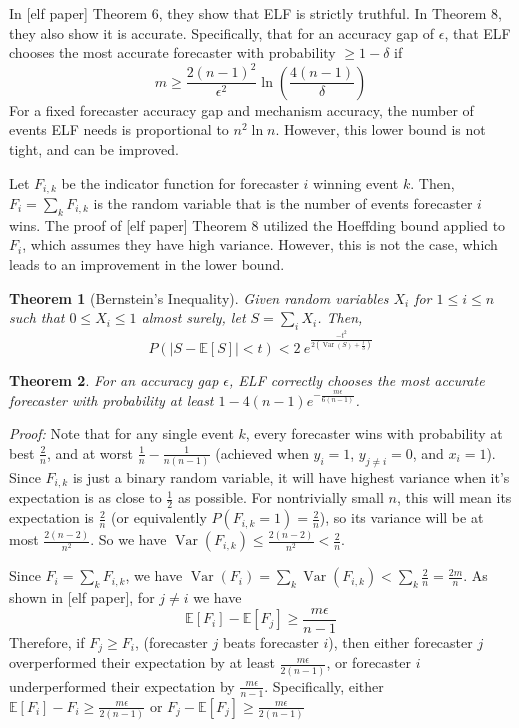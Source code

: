 \documentclass[letterpaper,12pt]{article}
\DeclareMathOperator*{\Var}{Var}
\newcommand{\E}{\mathbb{E}}
\newcommand{\1}{\mathbbm{1}}
\newtheorem{theorem}{Theorem}
\begin{document}
In [elf paper] Theorem 6, they show that ELF is strictly truthful. In Theorem 8, they also show it is accurate. Specifically, that for an accuracy gap of $\epsilon$, that ELF chooses the most accurate forecaster with probability $ \geq 1 - \delta$ if
\[ m \geq \frac{2(n-1)^2}{\epsilon^2} \ln \left(\frac{4(n-1)}{\delta}\right)\]
For a fixed forecaster accuracy gap and mechanism accuracy, the number of events ELF needs is proportional to $n^2 \ln n$. However, this lower bound is not tight, and can be improved. 

Let $F_{i, k}$ be the indicator function for forecaster $i$ winning event $k$. Then, $F_i = \sum_k F_{i, k}$ is the random variable that is the number of events forecaster $i$ wins. The proof of [elf paper] Theorem 8 utilized the Hoeffding bound applied to $F_i$, which assumes they have high variance. However, this is not the case, which leads to an improvement in the lower bound. 
\begin{theorem}[Bernstein's Inequality]
  \label{bernstein}
  Given random variables $X_i$ for $1 \leq i \leq n$ such that $0 \leq X_i \leq 1$ almost surely, let $S = \sum_i X_i$. Then,
  \[ P\left(|S - \E[S]| < t\right) < 2 \: e^{\frac{-t^2 }{2\left(\Var(S) + \frac{t}{3}\right)} } \]
\end{theorem}
\begin{theorem}
  \label{elf_bound}
  For an accuracy gap $\epsilon$, ELF correctly chooses the most accurate forecaster with probability at least $1 - 4 (n-1) e^{-\frac{m \epsilon}{6(n - 1)}}$.
\end{theorem}
\emph{Proof:} Note that for any single event $k$, every forecaster wins with probability at best $\frac{2}{n}$, and at worst $\frac{1}{n} - \frac{1}{n(n-1)}$ (achieved when $y_i = 1$, $y_{j\neq i} = 0$, and $x_i = 1$). Since $F_{i, k}$ is just a binary random variable, it will have highest variance when it's expectation is as close to $\frac{1}{2}$ as possible. For nontrivially small $n$, this will mean its expectation is $\frac{2}{n}$ (or equivalently $P(F_{i, k} = 1) = \frac{2}{n}$), so its variance will be at most $\frac{2(n-2)}{n^2}$. So we have $\Var(F_{i, k}) \leq \frac{2(n-2)}{n^2} < \frac{2}{n}$. 

Since $F_i = \sum_k F_{i, k}$, we have $\Var(F_i) = \sum_k \Var(F_{i, k}) < \sum_k \frac{2}{n} = \frac{2m}{n}$. As shown in [elf paper], for $j\neq i$ we have 
\[ \E[F_i] - \E[F_j] \geq \frac{m \epsilon}{n - 1}\]
Therefore, if $F_j \geq F_i$, (forecaster $j$ beats forecaster $i$), then either forecaster $j$ overperformed their expectation by at least $\frac{m \epsilon}{2(n - 1)}$, or forecaster $i$ underperformed their expectation by $\frac{m \epsilon}{n - 1}$. Specifically, either $\E[F_i] - F_i \geq \frac{m \epsilon}{2(n - 1)}$ or $F_j - \E[F_j] \geq \frac{m \epsilon}{2(n - 1)}$
\end{document}
